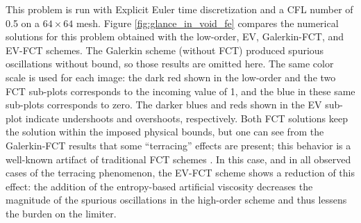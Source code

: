 This problem is run with Explicit Euler time discretization and a CFL
number of 0.5 on a $64\times64$ mesh. Figure \ref{fig:glance_in_void_fe}
compares the numerical solutions for this problem obtained with the
low-order, EV, Galerkin-FCT, and EV-FCT schemes. The Galerkin scheme
(without FCT) produced spurious oscillations without bound, so those
results are omitted here.
The same color scale is used for each image: the dark red shown in the low-order and the two FCT
sub-plots corresponds to the incoming value of 1, and the blue in these
same sub-plots corresponds to zero. The darker blues and reds shown in
the EV sub-plot indicate undershoots and overshoots, respectively. Both FCT solutions
keep the solution within the imposed physical bounds, but one can see from
the Galerkin-FCT results that some ``terracing'' effects are present; this
behavior is a well-known artifact of traditional FCT schemes \cite{kuzmin_FCT}.
In this case, and in all observed cases of the terracing phenomenon,
the EV-FCT scheme shows a reduction of this effect: the addition of the
entropy-based artificial viscosity decreases the magnitude of the spurious
oscillations in the high-order scheme and thus lessens the burden on the limiter.


